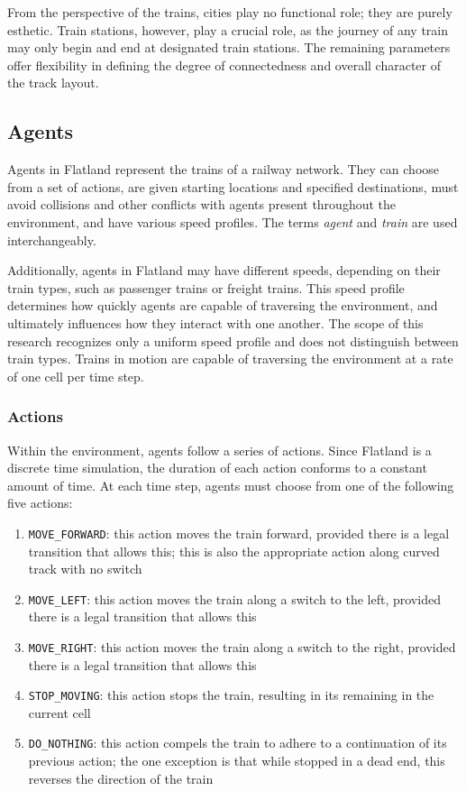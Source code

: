 \documentclass[11pt]{article}
\newcommand{\code}[1]{\colorbox{light-gray}{\texttt{#1}}}
\begin{document}
\noindent From the perspective of the trains, cities play no functional role; they are purely esthetic. Train stations, however, play a crucial role, as the journey of any train may only begin and end at designated train stations.  The remaining parameters offer flexibility in defining the degree of connectedness and overall character of the track layout. \medskip


\subsection{Agents}
\label{sec:Agents}
Agents in Flatland represent the trains of a railway network.  They can choose from a set of actions, are given starting locations and specified destinations, must avoid collisions and other conflicts with agents present throughout the environment, and have various speed profiles.  The terms \textit{agent} and \textit{train} are used interchangeably.

Additionally, agents in Flatland may have different speeds, depending on their train types, such as passenger trains or freight trains.  This speed profile determines how quickly agents are capable of traversing the environment, and ultimately influences how they interact with one another.  The scope of this research recognizes only a uniform speed profile and does not distinguish between train types.  Trains in motion are capable of traversing the environment at a rate of one cell per time step.

\subsubsection{Actions}
\label{sec:Actions}
Within the environment, agents follow a series of actions.  Since Flatland is a discrete time simulation, the duration of each action conforms to a constant amount of time.    At each time step, agents must choose from one of the following five actions: 
\begin{enumerate}
  \item \code{MOVE\_FORWARD}: this action moves the train forward, provided there is a legal transition that allows this; this is also the appropriate action along curved track with no switch
  \item \code{MOVE\_LEFT}: this action moves the train along a switch to the left, provided there is a legal transition that allows this
  \item \code{MOVE\_RIGHT}: this action moves the train along a switch to the right, provided there is a legal transition that allows this
  \item \code{STOP\_MOVING}: this action stops the train, resulting in its remaining in the current cell
  \item \code{DO\_NOTHING}: this action compels the train to adhere to a continuation of its previous action; the one exception is that while stopped in a dead end, this reverses the direction of the train
\end{enumerate} \smallskip
\end{document}

